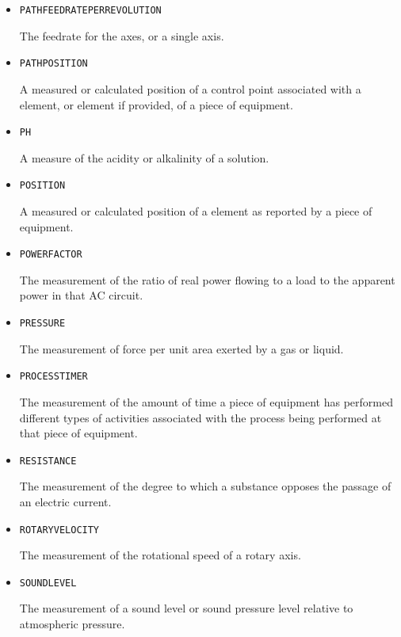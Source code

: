 \begin{itemize}
\item \texttt{PATH\textunderscore FEEDRATE\textunderscore PER\textunderscore REVOLUTION}  

The feedrate for the axes, or a single axis.


\item \texttt{PATH\textunderscore POSITION}  

A measured or calculated position of a control point associated with a  element, or  element if provided, of a piece of equipment.


\item \texttt{PH}  

A measure of the acidity or alkalinity of a solution.


\item \texttt{POSITION}  

A measured or calculated position of a  element as reported by a piece of equipment.


\item \texttt{POWER\textunderscore FACTOR}  

The measurement of the ratio of real power flowing to a load to the apparent power in that AC circuit.


\item \texttt{PRESSURE}  

The measurement of force per unit area exerted by a gas or liquid.


\item \texttt{PROCESS\textunderscore TIMER}  

The measurement of the amount of time a piece of equipment has performed different types of activities associated with the process being performed at that piece of equipment.


\item \texttt{RESISTANCE}  

The measurement of the degree to which a substance opposes the passage of an electric current.


\item \texttt{ROTARY\textunderscore VELOCITY}  

The measurement of the rotational speed of a rotary axis.


\item \texttt{SOUND\textunderscore LEVEL}  

The measurement of a sound level or sound pressure level relative to atmospheric pressure.



\end{itemize}
